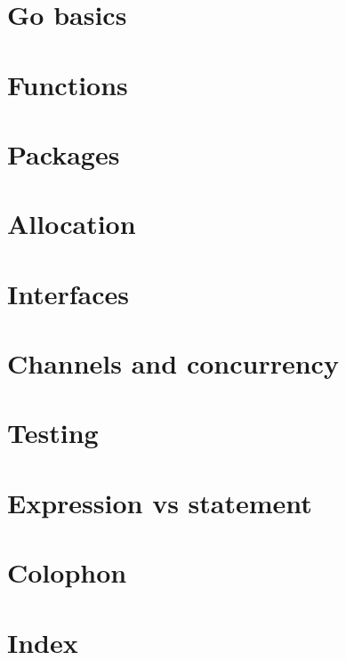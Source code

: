 \documentclass[a4paper,twoside]{blocksbook}
\begin{document}
\chapter{Go basics}
\label{chap:basics}


\chapter{Functions}
\label{chap:functions}


\chapter{Packages}
\label{chap:packages}


\chapter{Allocation}
\label{chap:allocation}


\chapter{Interfaces}
\label{chap:interfaces}


\chapter{Channels and concurrency}
\label{chap:channels}


\chapter{Testing}
\label{chap:testing}

\appendix
\chapter{Expression vs statement}


\chapter{Colophon}


\chapter{Index}
\printindex


\end{document}
